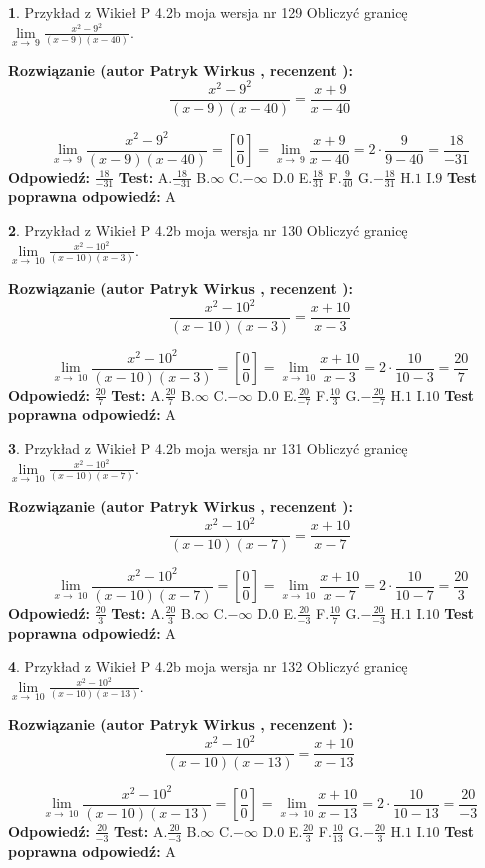 \documentclass[12pt, a4paper]{article}
\theoremstyle{definition} %
\newtheorem{zad}{}
\newcommand{\zadStart}[1]{\begin{zad}#1\newline}
\newcommand{\zadStop}{\end{zad}}
\newcommand{\rozwStart}[2]{\noindent \textbf{Rozwiązanie (autor #1 , recenzent #2): }\newline}
\newcommand{\rozwStop}{\newline}
\newcommand{\odpStart}{\noindent \textbf{Odpowiedź:}\newline}
\newcommand{\odpStop}{\newline}
\newcommand{\testStart}{\noindent \textbf{Test:}\newline}
\newcommand{\testStop}{\newline}
\newcommand{\kluczStart}{\noindent \textbf{Test poprawna odpowiedź:}\newline}
\newcommand{\kluczStop}{\newline}
\begin{document}
\zadStart{Przykład z Wikieł P 4.2b moja wersja nr 129}
Obliczyć granicę $\lim\limits_{x\to\ 9}\frac{x^{2}-9^{2}}{(x-9)(x-40)}$.
\zadStop
\rozwStart{Patryk Wirkus}{}
$$\frac{x^{2}-9^{2}}{(x-9)(x-40)}=\frac{x+9}{x-40}$$

$$\lim\limits_{x\to\ 9}\frac{x^{2}-9^{2}}{(x-9)(x-40)}=[\frac{0}{0}]=\lim\limits_{x\to\ 9}\frac{x+9}{x-40}=2 \cdot \frac{9}{9-40} = \frac{18}{-31}$$
\rozwStop
\odpStart
$\frac{18}{-31}$
\odpStop
\testStart
A.$\frac{18}{-31}$
B.$\infty$
C.$-\infty$
D.$0$
E.$\frac{18}{31}$
F.$\frac{9}{40}$
G.$-\frac{18}{31}$
H.$1$
I.$9$
\testStop
\kluczStart
A
\kluczStop



\zadStart{Przykład z Wikieł P 4.2b moja wersja nr 130}
Obliczyć granicę $\lim\limits_{x\to\ 10}\frac{x^{2}-10^{2}}{(x-10)(x-3)}$.
\zadStop
\rozwStart{Patryk Wirkus}{}
$$\frac{x^{2}-10^{2}}{(x-10)(x-3)}=\frac{x+10}{x-3}$$

$$\lim\limits_{x\to\ 10}\frac{x^{2}-10^{2}}{(x-10)(x-3)}=[\frac{0}{0}]=\lim\limits_{x\to\ 10}\frac{x+10}{x-3}=2 \cdot \frac{10}{10-3} = \frac{20}{7}$$
\rozwStop
\odpStart
$\frac{20}{7}$
\odpStop
\testStart
A.$\frac{20}{7}$
B.$\infty$
C.$-\infty$
D.$0$
E.$\frac{20}{-7}$
F.$\frac{10}{3}$
G.$-\frac{20}{-7}$
H.$1$
I.$10$
\testStop
\kluczStart
A
\kluczStop



\zadStart{Przykład z Wikieł P 4.2b moja wersja nr 131}
Obliczyć granicę $\lim\limits_{x\to\ 10}\frac{x^{2}-10^{2}}{(x-10)(x-7)}$.
\zadStop
\rozwStart{Patryk Wirkus}{}
$$\frac{x^{2}-10^{2}}{(x-10)(x-7)}=\frac{x+10}{x-7}$$

$$\lim\limits_{x\to\ 10}\frac{x^{2}-10^{2}}{(x-10)(x-7)}=[\frac{0}{0}]=\lim\limits_{x\to\ 10}\frac{x+10}{x-7}=2 \cdot \frac{10}{10-7} = \frac{20}{3}$$
\rozwStop
\odpStart
$\frac{20}{3}$
\odpStop
\testStart
A.$\frac{20}{3}$
B.$\infty$
C.$-\infty$
D.$0$
E.$\frac{20}{-3}$
F.$\frac{10}{7}$
G.$-\frac{20}{-3}$
H.$1$
I.$10$
\testStop
\kluczStart
A
\kluczStop



\zadStart{Przykład z Wikieł P 4.2b moja wersja nr 132}
Obliczyć granicę $\lim\limits_{x\to\ 10}\frac{x^{2}-10^{2}}{(x-10)(x-13)}$.
\zadStop
\rozwStart{Patryk Wirkus}{}
$$\frac{x^{2}-10^{2}}{(x-10)(x-13)}=\frac{x+10}{x-13}$$

$$\lim\limits_{x\to\ 10}\frac{x^{2}-10^{2}}{(x-10)(x-13)}=[\frac{0}{0}]=\lim\limits_{x\to\ 10}\frac{x+10}{x-13}=2 \cdot \frac{10}{10-13} = \frac{20}{-3}$$
\rozwStop
\odpStart
$\frac{20}{-3}$
\odpStop
\testStart
A.$\frac{20}{-3}$
B.$\infty$
C.$-\infty$
D.$0$
E.$\frac{20}{3}$
F.$\frac{10}{13}$
G.$-\frac{20}{3}$
H.$1$
I.$10$
\testStop
\kluczStart
A
\kluczStop
\end{document}
